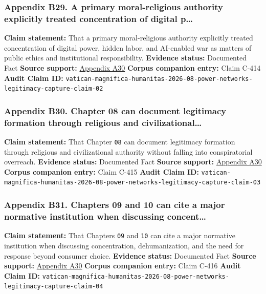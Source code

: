 \documentclass[
  american,
  11pt,
  letterpaper,
]{article}
\begin{document}
\subsubsection{Appendix B29. A primary moral-religious authority
explicitly treated concentration of digital
p\ldots{}}\label{appendix-b29-a-primary-moral-religious-authority-explicitly-treated-concentration-of-digital-p}

\textbf{Claim statement:} That a primary moral-religious authority
explicitly treated concentration of digital power, hidden labor, and
AI-enabled war as matters of public ethics and institutional
responsibility. \textbf{Evidence status:} Documented Fact \textbf{Source
support:}
\hyperref[appendix-a30-encyclical-letter-of-his-holiness-leo-xiv-magnifica-humanitas]{Appendix
A30} \textbf{Corpus companion entry:} Claim C-414 \textbf{Audit Claim
ID:}
\texttt{vatican-magnifica-humanitas-2026-08-power-networks-legitimacy-capture-claim-02}

\subsubsection{Appendix B30. Chapter 08 can document legitimacy
formation through religious and
civilizational\ldots{}}\label{appendix-b30-chapter-08-can-document-legitimacy-formation-through-religious-and-civilizational}

\textbf{Claim statement:} That Chapter \texttt{08} can document
legitimacy formation through religious and civilizational authority
without falling into conspiratorial overreach. \textbf{Evidence status:}
Documented Fact \textbf{Source support:}
\hyperref[appendix-a30-encyclical-letter-of-his-holiness-leo-xiv-magnifica-humanitas]{Appendix
A30} \textbf{Corpus companion entry:} Claim C-415 \textbf{Audit Claim
ID:}
\texttt{vatican-magnifica-humanitas-2026-08-power-networks-legitimacy-capture-claim-03}

\subsubsection{Appendix B31. Chapters 09 and 10 can cite a major
normative institution when discussing
concent\ldots{}}\label{appendix-b31-chapters-09-and-10-can-cite-a-major-normative-institution-when-discussing-concent}

\textbf{Claim statement:} That Chapters \texttt{09} and \texttt{10} can
cite a major normative institution when discussing concentration,
dehumanization, and the need for response beyond consumer choice.
\textbf{Evidence status:} Documented Fact \textbf{Source support:}
\hyperref[appendix-a30-encyclical-letter-of-his-holiness-leo-xiv-magnifica-humanitas]{Appendix
A30} \textbf{Corpus companion entry:} Claim C-416 \textbf{Audit Claim
ID:}
\texttt{vatican-magnifica-humanitas-2026-08-power-networks-legitimacy-capture-claim-04}
\end{document}
